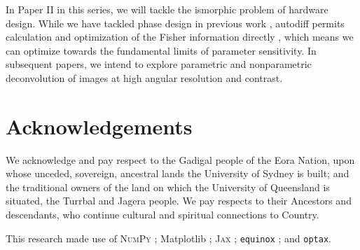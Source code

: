\documentclass[twocolumn]{spie}
\newcommand\optax{\texttt{optax}\xspace}
\begin{document}
In Paper II in this series, we will tackle the ismorphic problem of hardware design. While we have tackled phase design in previous work \cite{phase_ret_and_design}, autodiff permits calculation and optimization of the Fisher information directly \cite{Coe2009}, which means we can optimize towards the fundamental limits of parameter sensitivity. In subsequent papers, we intend to explore parametric and nonparametric deconvolution of images at high angular resolution and contrast.


\section{Acknowledgements}

We acknowledge and pay respect to the Gadigal people of the Eora Nation, upon whose unceded, sovereign, ancestral lands the University of Sydney is built; and the traditional owners of the land on which the University of Queensland is situated, the Turrbal and Jagera people. We pay respects to their Ancestors and descendants, who continue cultural and spiritual connections to Country. 

This research made use of \textsc{NumPy} \cite{numpy}; Matplotlib \cite{matplotlib}; \textsc{Jax} \cite{jax}; \texttt{equinox} \cite{kidger2021equinox}; and \optax \cite{optax2020github}.


\end{document}

